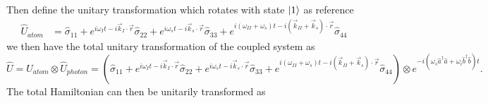 \documentclass[aps,pra,showpacs,amsmath,amssymb,nofootinbib,longbibliography,superscriptaddress
]{revtex4-1}
\DeclarePairedDelimiter\ket{\lvert}{\rangle}
\theoremstyle{definition}
\theoremstyle{remark}
\newcommand{\0}{\hat{0}}
\begin{document}
Then define the unitary transformation which rotates with state $\ket{1}$ as reference
\begin{align}
    \hat{U}_{atom} &= \hat{\sigma}_{11} + e^{i \omega_I t - i \vec{k}_I \cdot \vec{r}} \hat{\sigma}_{22} + e^{i \omega_s t - i \vec{k}_s \cdot \vec{r}} \hat{\sigma}_{33} + e^{i(\omega_{II} + \omega_s) t - i(\vec{k}_{II} + \vec{k}_s) \cdot \vec{r}} \hat{\sigma}_{44}
\end{align}
we then have the total unitary transformation of the coupled system as
\begin{equation}
    \hat{U} = \hat{U}_{atom} \otimes \hat{U}_{photon} = \left(\hat{\sigma}_{11} + e^{i \omega_I t - i \vec{k}_I \cdot \vec{r}} \hat{\sigma}_{22} + e^{i \omega_s t - i \vec{k}_s \cdot \vec{r}} \hat{\sigma}_{33} + e^{i(\omega_{II} + \omega_s) t - i(\vec{k}_{II} + \vec{k}_s) \cdot \vec{r}} \hat{\sigma}_{44}\right) \otimes e^{-i(\omega_s \hat{a}^{\dagger} \hat{a} + \omega_i \hat{b}^{\dagger} \hat{b})t}.
\end{equation}
The total Hamiltonian can then be unitarily transformed as
\end{document}
